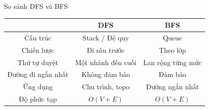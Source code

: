 \documentclass{beamer}
\newcommand{\hlblue}[1]{\textcolor{myblue}{#1}}
\newcommand{\hlgreen}[1]{\textcolor{mygreen}{#1}}
\newcommand{\hlred}[1]{\textcolor{myred}{#1}}
\begin{document}
\begin{frame}{So sánh DFS và BFS}

\begin{tcolorbox}

\begin{tabular}{|c|c|c|}
\hline
\textbf{} & \textbf{\hlblue{DFS}} & \textbf{\hlgreen{BFS}} \\
\hline

Cấu trúc 
& Stack / Đệ quy 
& Queue \\
\hline

Chiến lược 
& Đi \hlred{sâu} trước 
& Theo \hlblue{lớp} \\
\hline

Thứ tự duyệt 
& Một nhánh đến cuối 
& Lan rộng từng mức \\
\hline

Đường đi ngắn nhất 
& Không đảm bảo 
& \hlgreen{Đảm bảo} \\
\hline

Ứng dụng 
& Chu trình, topo 
& Đường ngắn nhất \\
\hline

Độ phức tạp 
& $O(V+E)$ 
& $O(V+E)$ \\
\hline

\end{tabular}

\end{tcolorbox}

\end{frame}
\end{document}
